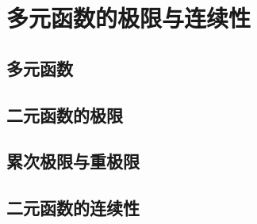 
\section{多元函数的极限与连续性}
\label{sec:limit-and-continuousness-of-multivar-fun}

\subsection{多元函数}
\label{sec:multivar-function}

\subsection{二元函数的极限}
\label{sec:limit-of-two-variable-function}

\subsection{累次极限与重极限}
\label{sec:cascade-limit-and-overlay-limit}



\subsection{二元函数的连续性}
\label{sec:continuousness-of-two-variable-function}



